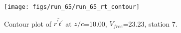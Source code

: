 \begin{figure}[H]
\centering
\texttt{[image: figs/run\_65/run\_65\_rt\_contour]}
\caption{Contour plot of $\overline{r^\prime t^\prime}$ at $z/c$=10.00, $V_{free}$=23.23, station 7.}
\label{fig:run_65_rt_contour}
\end{figure}


